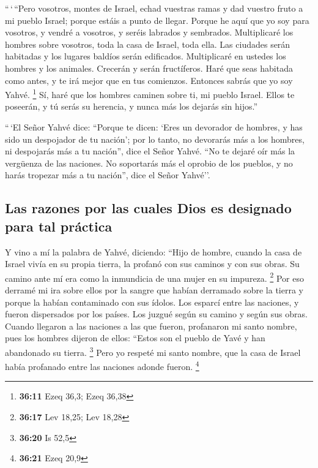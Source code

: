  ``\,`\,``Pero vosotros, montes de Israel, echad vuestras
ramas y dad vuestro fruto a mi pueblo Israel; porque estáis a punto de
llegar.  Porque he aquí que yo soy para vosotros, y vendré
a vosotros, y seréis labrados y sembrados.  Multiplicaré
los hombres sobre vosotros, toda la casa de Israel, toda ella. Las
ciudades serán habitadas y los lugares baldíos serán edificados.
 Multiplicaré en ustedes los hombres y los animales.
Crecerán y serán fructíferos. Haré que seas habitada como antes, y te
irá mejor que en tus comienzos. Entonces sabrás que yo soy Yahvé.
\footnote{\textbf{36:11} Ezeq 36,3; Ezeq 36,38}  Sí, haré
que los hombres caminen sobre ti, mi pueblo Israel. Ellos te poseerán, y
tú serás su herencia, y nunca más los dejarás sin hijos.''

 ``\,`El Señor Yahvé dice: ``Porque te dicen: `Eres un
devorador de hombres, y has sido un despojador de tu nación';
 por lo tanto, no devorarás más a los hombres, ni
despojarás más a tu nación'', dice el Señor Yahvé.  ``No
te dejaré oír más la vergüenza de las naciones. No soportarás más el
oprobio de los pueblos, y no harás tropezar más a tu nación'', dice el
Señor Yahvé''.

\hypertarget{las-razones-por-las-cuales-dios-es-designado-para-tal-pruxe1ctica}{%
\subsection{Las razones por las cuales Dios es designado para tal
práctica}\label{las-razones-por-las-cuales-dios-es-designado-para-tal-pruxe1ctica}}

 Y vino a mí la palabra de Yahvé, diciendo:
 ``Hijo de hombre, cuando la casa de Israel vivía en su
propia tierra, la profanó con sus caminos y con sus obras. Su camino
ante mí era como la inmundicia de una mujer en su impureza. \footnote{\textbf{36:17}
  Lev 18,25; Lev 18,28}  Por eso derramé mi ira sobre
ellos por la sangre que habían derramado sobre la tierra y porque la
habían contaminado con sus ídolos.  Los esparcí entre las
naciones, y fueron dispersados por los países. Los juzgué según su
camino y según sus obras.  Cuando llegaron a las naciones
a las que fueron, profanaron mi santo nombre, pues los hombres dijeron
de ellos: ``Estos son el pueblo de Yavé y han abandonado su tierra.
\footnote{\textbf{36:20} Is 52,5}  Pero yo respeté mi
santo nombre, que la casa de Israel había profanado entre las naciones
adonde fueron. \footnote{\textbf{36:21} Ezeq 20,9}

